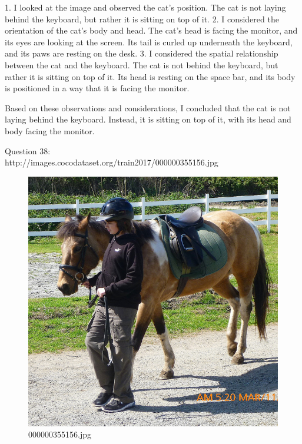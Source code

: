 \begin{enumerate}
        1. I looked at the image and observed the cat’s position. The cat is not laying behind the keyboard, but rather it is sitting on top of it.
        2. I considered the orientation of the cat’s body and head. The cat’s head is facing the monitor, and its eyes are looking at the screen. Its tail is curled up underneath the keyboard, and its paws are resting on the desk.
        3. I considered the spatial relationship between the cat and the keyboard. The cat is not behind the keyboard, but rather it is sitting on top of it. Its head is resting on the space bar, and its body is positioned in a way that it is facing the monitor.
        
        Based on these observations and considerations, I concluded that the cat is not laying behind the keyboard. Instead, it is sitting on top of it, with its head and body facing the monitor.
    \end{enumerate}
    Question 38:\\http://images.cocodataset.org/train2017/000000355156.jpg
    \begin{figure}[h]
        \centering
        \includegraphics[width=0.8\linewidth]{../image set/easy/000000355156.jpg}
        \caption{000000355156.jpg}
    \end{figure}
